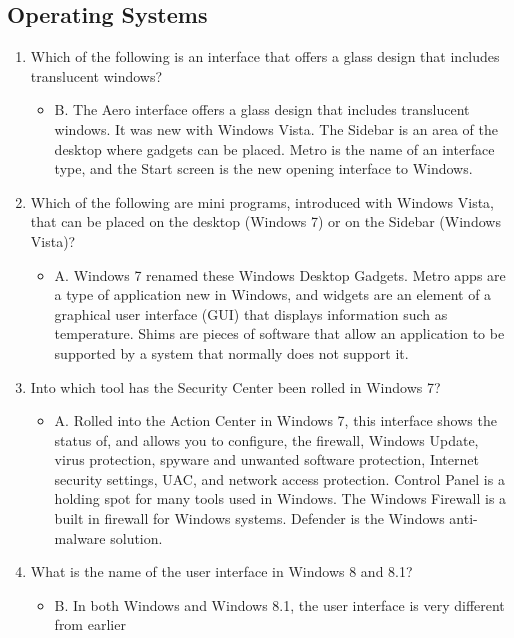 \documentclass{article}
\begin{document}
\subsection{Operating Systems} 
\begin{enumerate}
    \item Which of the following is an interface that offers a glass design that includes translucent
windows?
    \begin{itemize}
        \item B. The Aero interface offers a glass design that includes translucent windows. It was new
with Windows Vista. The Sidebar is an area of the desktop where gadgets can be placed.
Metro is the name of an interface type, and the Start screen is the new opening interface to
Windows.
    \end{itemize}
    \item Which of the following are mini programs, introduced with Windows Vista, that can be
placed on the desktop (Windows 7) or on the Sidebar (Windows Vista)?
    \begin{itemize}
        \item A. Windows 7 renamed these Windows Desktop Gadgets. Metro apps are a type of
application new in Windows, and widgets are an element of a graphical user interface (GUI)
that displays information such as temperature. Shims are pieces of software that allow an
application to be supported by a system that normally does not support it.
    \end{itemize}
    \item Into which tool has the Security Center been rolled in Windows 7?
    \begin{itemize}
        \item A. Rolled into the Action Center in Windows 7, this interface shows the status of, and
allows you to configure, the firewall, Windows Update, virus protection, spyware and
unwanted software protection, Internet security settings, UAC, and network access
protection. Control Panel is a holding spot for many tools used in Windows. The Windows
Firewall is a built in firewall for Windows systems. Defender is the Windows anti-malware
solution.
    \end{itemize}
    \item What is the name of the user interface in Windows 8 and 8.1?
    \begin{itemize}
        \item B. In both Windows and Windows 8.1, the user interface is very different from earlier

\end{itemize}
\end{enumerate}
\end{document}
